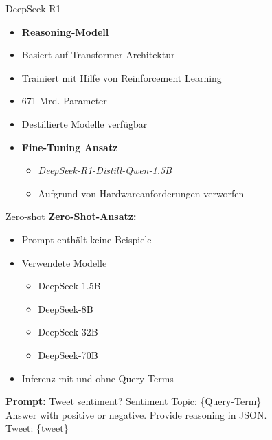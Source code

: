 \documentclass[aspectratio=169]{beamer} %
\begin{document}
\begin{frame}{DeepSeek-R1}
\begin{itemize}
\item \textbf{Reasoning-Modell}
\item Basiert auf Transformer Architektur
\item Trainiert mit Hilfe von Reinforcement Learning
\item 671 Mrd. Parameter
\item Destillierte Modelle verfügbar
\end{itemize}
\vspace{0.4cm}

\begin{itemize}
    \item \textbf{Fine-Tuning Ansatz}
    \begin{itemize}
        \item \textit{DeepSeek-R1-Distill-Qwen-1.5B}
        \item Aufgrund von Hardwareanforderungen verworfen
\end{itemize}
\end{itemize}
\end{frame}

\begin{frame}{Zero-shot}
  \textbf{Zero-Shot-Ansatz:}

  \vspace{0.35cm}

  \begin{itemize}
      \item Prompt enthält keine Beispiele
      \item Verwendete Modelle
      \begin{itemize}
          \item DeepSeek-1.5B
          \item DeepSeek-8B
          \item DeepSeek-32B
          \item DeepSeek-70B
      \end{itemize}
      \item Inferenz mit und ohne Query-Terms
  \end{itemize}
  \vspace{0.2cm}
  \centering
  \textbf{Prompt:} Tweet sentiment? Sentiment Topic: \{Query-Term\} \\
  Answer with positive or negative. Provide reasoning in JSON.\\
    Tweet: \glqq\{tweet\}\grqq
\end{frame}
\end{document}
